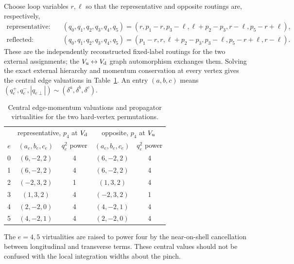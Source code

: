 \documentclass[a4paper,11pt]{article}
\begin{document}
Choose loop variables \(r,\ell\) so that the representative and opposite
routings are, respectively,
\begin{align}
\text{representative:}\quad
&(q_0,q_1,q_2,q_3,q_4,q_5)
 =(r,p_1-r,p_3-\ell,\ell+p_2-p_3,r-\ell,p_5-r+\ell),
 \nonumber\\
\text{reflected:}\quad
&(q_0,q_1,q_2,q_3,q_4,q_5)
 =(p_1-r,r,\ell+p_2-p_3,p_3-\ell,p_5-r+\ell,r-\ell).
 \label{eq:five-central-soft-two-routings}
\end{align}
These are the independently reconstructed fixed-label routings for the two
external assignments; the \(V_{\rm u}\leftrightarrow V_{\rm d}\) graph
automorphism exchanges them.  Solving the exact external hierarchy and
momentum conservation at every vertex gives the central edge valuations in
Table~\ref{tab:five-central-soft-central-values}.
An entry \((a,b,c)\) means
\((q_e^+,q_e^-,|q_{e\perp}|)\sim
(\delta^a,\delta^b,\delta^c)\).
\begin{table}[H]
\centering
\small
\begin{tabular}{@{}c cc cc@{}}
\toprule
& \multicolumn{2}{c}{representative, \(p_4\) at \(V_{\rm d}\)}
& \multicolumn{2}{c}{opposite, \(p_4\) at \(V_{\rm u}\)}\\
\(e\) & \((a_e,b_e,c_e)\) & \(q_e^2\) power
      & \((a_e,b_e,c_e)\) & \(q_e^2\) power\\
\midrule
0 & \((6,-2,2)\) & 4 & \((6,-2,2)\) & 4\\
1 & \((6,-2,2)\) & 4 & \((6,-2,2)\) & 4\\
2 & \((-2,3,2)\) & 1 & \((1,3,2)\) & 4\\
3 & \((1,3,2)\) & 4 & \((-2,3,2)\) & 1\\
4 & \((2,-2,0)\) & 4 & \((4,-2,1)\) & 4\\
5 & \((4,-2,1)\) & 4 & \((2,-2,0)\) & 4\\
\bottomrule
\end{tabular}
\caption{Central edge-momentum valuations and propagator virtualities for
the two hard-vertex permutations.}
\label{tab:five-central-soft-central-values}
\end{table}
The \(e=4,5\) virtualities are raised to power four by the near-on-shell
cancellation between longitudinal and transverse terms.  These central
values should not be confused with the local integration widths about the
pinch.
\end{document}
